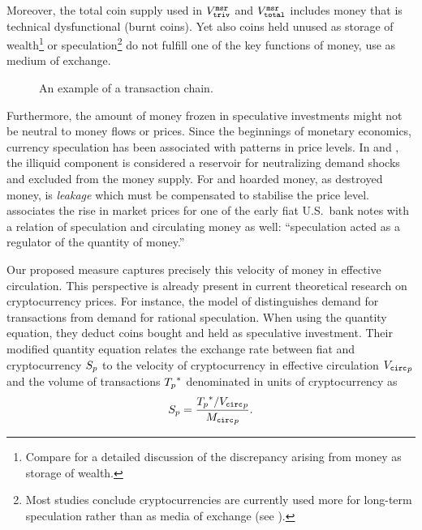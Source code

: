 Moreover, the total coin supply used in ${V_{\mathtt{triv}}^{\mathtt{msr}}}$ and ${V_{\mathtt{total}}^{\mathtt{msr}}}$
includes money that is technical dysfunctional (burnt coins). %
Yet also coins held unused as storage of wealth\footnote{Compare
  \cite{sawyer2003money} for a detailed discussion of the discrepancy arising
  from money as storage of wealth.} %
or speculation\footnote{Most studies conclude cryptocurrencies are currently used more for
  long-term speculation rather than as media of exchange %
  (see \eg \cite{%
    bouri2019herding,%
    anderson2019bitcoin,%
    yang2018behavioral,%
    yermack2015bitcoin%
  }).
} %
do not fulfill one of the key functions of money, use as medium of exchange.%
\begin{figure*}[ht!]%
	\centering
	\ifdefined\varInputFigs%
	
	\else%
	\fi%
	\caption{%
		An example of a transaction chain. %
	}%
	\label{fig:mcirc_concept}%
\end{figure*}%

Furthermore, the amount of money frozen in speculative investments might not
be neutral to money flows or prices. %
Since the beginnings of monetary economics, currency speculation has been
associated with patterns in price levels. %
In \cite{fullarton1845regulation} and \cite{marx1872kapital}, the illiquid
component is considered a reservoir for neutralizing demand shocks and
excluded from the money supply. %
For \cite{keynes1930treatise} and \cite{commons2003institutional} hoarded
money, as destroyed money, is \emph{leakage} which must be compensated to
stabilise the price level. %
\cite{fisher1911equation} associates the rise in market prices for one of the
early fiat U.S.\ bank notes with a relation of speculation and circulating
money as well: ``speculation acted as a regulator of the quantity of
money.'' %

Our proposed measure captures precisely this velocity of money in effective
circulation.  %
This perspective is already present in current theoretical research on
cryptocurrency prices.  %
For instance, the model of \cite{bolt2016value} distinguishes demand for
transactions from demand for rational speculation.
When using the quantity equation, they deduct coins bought and held as
speculative investment. %
Their modified quantity equation relates the exchange rate between fiat and
cryptocurrency $S_{{p}}$ to the velocity of cryptocurrency in effective
circulation ${{V_{\mathtt{circ}}}_{p}}$ and the volume of transactions ${T_{p}}^{\ast}$ denominated
in units of cryptocurrency as %
\begin{align}
  S_{{p}} = \frac{{T_{p}}^{\ast} / {{V_{\mathtt{circ}}}_{p}}}{{{M_{\mathtt{circ}}}_{p}}}.
\end{align}

